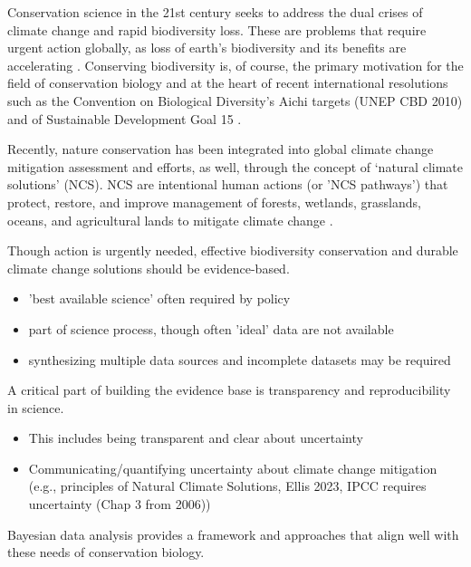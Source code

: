 \documentclass{article}
\begin{document}
\par Conservation science in the 21st century seeks to address the dual crises of  climate change and rapid biodiversity loss. These are problems that require urgent action globally, as loss of earth's biodiversity and its benefits are accelerating \citep{brondizio2019assessing, ripple2017extinction,tittensor2014mid}. Conserving biodiversity is, of course, the primary motivation for the field of conservation biology \citep{williams2020past} and at the heart of recent international resolutions such as the Convention on Biological Diversity's Aichi targets (UNEP CBD 2010) and of Sustainable Development Goal 15 \citep{assembly2015resolution}. 
\par Recently, nature conservation has been integrated into global climate change mitigation assessment and efforts, as well, through the concept of ‘natural climate solutions’ (NCS). NCS are intentional human actions (or 'NCS pathways') that protect, restore, and improve management of forests, wetlands, grasslands, oceans, and agricultural lands to mitigate climate change \citep{griscom2017natural}.

\par Though action is urgently needed, effective biodiversity conservation and durable climate change solutions should be evidence-based. 
\begin{itemize}
\item 'best available science' often required by  policy
\item part of science process, though often 'ideal' data are not available
\item synthesizing multiple data sources  and incomplete datasets may be required 
\end{itemize}

\par 
\par A critical part of building the evidence base is transparency and reproducibility in science. 
\begin{itemize}
\item This includes being transparent and clear about uncertainty
\item Communicating/quantifying uncertainty about climate change mitigation (e.g., principles of Natural Climate Solutions, Ellis 2023, IPCC requires uncertainty (Chap 3 from 2006))

\end{itemize}
\par 
\par Bayesian data analysis provides a framework and approaches that align well with these needs of conservation biology.
\end{document}
